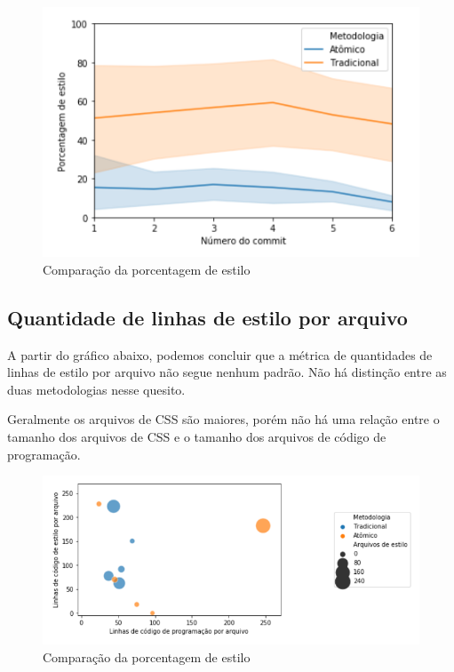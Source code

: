 \begin{figure}[H]
\centering
\includegraphics{figuras/commit-porcentagem-estilo.png}
\caption{Comparação da porcentagem de estilo}
\end{figure}


\hypertarget{porcentagem de estilo}{%
\subsection{Quantidade de linhas de estilo por arquivo}\label{parcel}}

A partir do gráfico abaixo, podemos concluir que a métrica de quantidades de linhas de estilo por arquivo não segue nenhum padrão. Não há distinção entre as duas metodologias nesse quesito.

Geralmente os arquivos de CSS são maiores, porém não há uma relação entre o tamanho dos arquivos de CSS e o tamanho dos arquivos de código de programação.


\begin{figure}[H]
\centering
\includegraphics{figuras/estilo-por-arquivo.png}
\caption{Comparação da porcentagem de estilo}
\end{figure}

